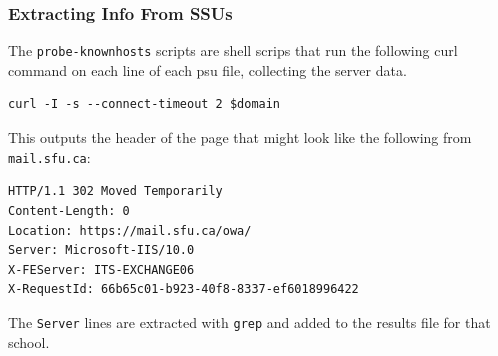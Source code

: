 \documentclass{article}
\theoremstyle{definition}
\begin{document}
\subsubsection{Extracting Info From SSUs}
The \texttt{probe-knownhosts} scripts are shell scrips
that run the following curl command on each line of each
psu file, collecting the server data.
\begin{lstlisting}
curl -I -s --connect-timeout 2 $domain
\end{lstlisting}
This outputs the header of the page that might look like the following from \texttt{mail.sfu.ca}:
\begin{lstlisting}
HTTP/1.1 302 Moved Temporarily
Content-Length: 0
Location: https://mail.sfu.ca/owa/
Server: Microsoft-IIS/10.0
X-FEServer: ITS-EXCHANGE06
X-RequestId: 66b65c01-b923-40f8-8337-ef6018996422
\end{lstlisting}
The \texttt{Server} lines are extracted with \texttt{grep} and added to the results file for that school.

\end{document}

